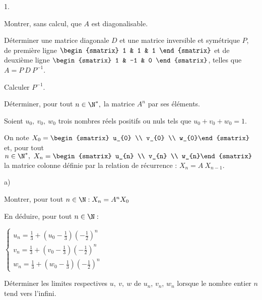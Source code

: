 \documentclass[11pt]{article}%
\begin{document}
\begin{noliste}{1.}
 \setlength{\itemsep}{4mm}
\item Montrer, sans calcul, que $A$ est diagonalisable.

\item Déterminer une matrice diagonale $D$ et une matrice inversible et
symétrique $P$, de première ligne $\begin{smatrix}
1 & 1 & 1
\end{smatrix}
$ et de deuxième ligne $\begin{smatrix}
1 & -1 & 0
\end{smatrix}
$, telles que $A = P~D~P^{-1}$.

Calculer $P^{-1}$.

\item Déterminer, pour tout $n\in \N^{\ast },$ la matrice $A^{n}$
par ses éléments.

\item Soient $u_{0},\ v_{0},\ w_{0}$ trois nombres réels positifs ou
nuls tels que $u_{0} + v_{0} + w_{0} = 1$.

On note $X_{0} = 
\begin{smatrix}
u_{0} \\
v_{0} \\
w_{0}\end{smatrix}
$ et, pour tout $n\in \N^{\ast },\ X_{n} = 
\begin{smatrix}
u_{n} \\
v_{n} \\
w_{n}\end{smatrix}
$ la matrice colonne définie par la relation de récurrence : $X_{n} =
A~X_{n-1}.$

\begin{noliste}{a)}
 \setlength{\itemsep}{2mm}
\item Montrer, pour tout $n\in \N :X_{n} = A^{n}X_{0}$

\item En déduire, pour tout $n\in \N :$

$\left\{ 
\begin{array}{c}
 u_{n} = \frac{1}{3} + \left( u_{0}-\frac{1}{3}\right) \left(
-\frac{1}{2}\right) ^{n} \\
 v_{n} = \frac{1}{3} + \left( v_{0}-\frac{1}{3}\right) \left(
-\frac{1}{2}\right) ^{n} \\
 w_{n} = \frac{1}{3} + \left( w_{0}-\frac{1}{3}\right) \left(
-\frac{1}{2}\right) ^{n}
\end{array}
\right. $

\item Déterminer les limites respectives $u,\ v,\ w$ de $u_{n}$,
$v_{n}$, $w_{n}$ lorsque le nombre entier $n$ tend vers l'infini.


\end{noliste}
\end{noliste}
\end{document}
